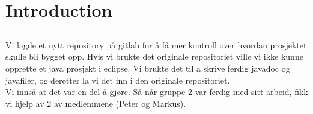\documentclass[11pt]{meetingmins}
\begin{document}
\maketitle
\section{Introduction}
\subsection{}

Vi lagde et nytt repository p{\aa} gitlab for {\aa} f{\aa} mer kontroll over hvordan prosjektet skulle bli bygget opp. Hvis vi brukte det originale repositoriet ville vi ikke kunne opprette et java prosjekt i eclipse. Vi brukte det til {\aa} skrive ferdig javadoc  og javafiler, og deretter la vi det inn i den originale repositoriet.\\

Vi inns{\aa} at det var en del {\aa} gj{\o}re. S{\aa} n{\aa}r gruppe 2 var ferdig med sitt arbeid, fikk vi hjelp av 2 av medlemmene (Peter og Markus).

\vspace{1em}
\end{document}
